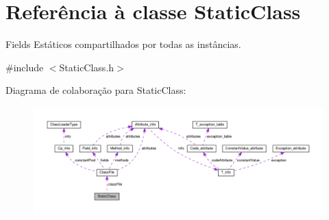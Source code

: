 \hypertarget{classStaticClass}{}\section{Referência à classe Static\+Class}
\label{classStaticClass}


Fields Estáticos compartilhados por todas as instâncias.  




{\ttfamily \#include $<$Static\+Class.\+h$>$}



Diagrama de colaboração para Static\+Class\+:\nopagebreak
\begin{figure}[H]
\begin{center}
\leavevmode
\includegraphics[width=350pt]{classStaticClass__coll__graph}
\end{center}
\end{figure}
